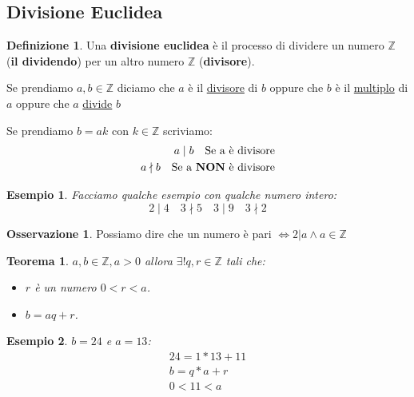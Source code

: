 \documentclass{article}
\newtheorem{exmp}{Esempio}[section]
\newtheorem{theorem}{Teorema}[section]
\theoremstyle{definition}
\newtheorem{definition}{Definizione}[section]
\newtheorem{oss}{Osservazione}[section]
\begin{document}
\subsection{Divisione Euclidea}\label{sec:divisione_euclidea}
\begin{definition}
       Una \textbf{divisione euclidea} è il processo di dividere un numero $ \mathbb{Z} $ (\textbf{il dividendo}) per un altro numero $ \mathbb{Z} $ (\textbf{divisore}). \par
       Se prendiamo $ a,b \in \mathbb{Z} $ diciamo che $ a $ è il \underline{divisore} di $ b $ oppure che $ b $ è il \underline{multiplo} di $ a $ oppure che $ a $ \underline{divide} $ b $        
\end{definition}

Se prendiamo $ b = ak $ con $ k \in \mathbb{Z} $ scriviamo:
\begin{align*}
        a \mid b \quad \mbox{Se a è divisore} \\
        a \nmid b \quad \mbox{Se a \textbf{NON} è divisore}
\end{align*}

\begin{exmp}
        Facciamo qualche esempio con qualche numero intero:
        \begin{equation*}
                2 \mid 4 \quad 3 \nmid 5 \quad 3 \mid 9 \quad 3 \nmid 2
        \end{equation*} 
\end{exmp}

\begin{tcolorbox}
\begin{oss}
       Possiamo dire che un numero è pari $ \Leftrightarrow 2 | a \wedge a \in \mathbb{Z} $  
\end{oss}
\end{tcolorbox}

\begin{tcolorbox}
\begin{theorem}
       $ a,b \in \mathbb{Z}, a > 0 $ allora $ \exists! q,r \in \mathbb{Z}  $ tali che:
       \begin{itemize}
               \item $ r $ è un numero $ 0 < r < a $.
               \item $ b = aq + r $.  
       \end{itemize}
\end{theorem}
\end{tcolorbox}

\begin{exmp}
        $ b = 24 $ e $ a = 13 $:
        \begin{align*}
                24 = 1 * 13 + 11 \\
                b = q * a + r \\
                0 < 11 < a
        \end{align*}
\end{exmp}
\end{document}
